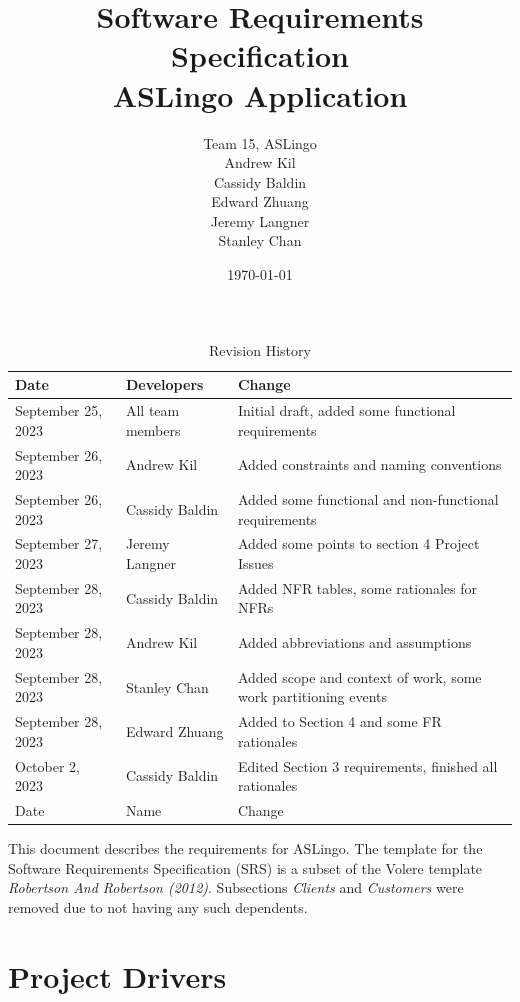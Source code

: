 \documentclass[12pt, titlepage]{article}
\title{Software Requirements Specification\\ASLingo Application}
\author{Team 15, ASLingo
		\\ Andrew Kil
		\\ Cassidy Baldin
		\\ Edward Zhuang
		\\ Jeremy Langner
		\\ Stanley Chan
}
\date{\today}
\begin{document}
\maketitle

\tableofcontents
\listoftables
\listoffigures

\begin{table}[H]
\caption{Revision History}
\begin{tabularx}{\textwidth}{|l|l|X|}
\hline {\bf Date} & {\bf Developers} & {\bf Change}\\
\hline
September 25, 2023 & All team members & Initial draft, added some functional requirements \\
September 26, 2023 & Andrew Kil & Added constraints and naming conventions \\
September 26, 2023 & Cassidy Baldin & Added some functional and non-functional requirements \\
September 27, 2023 & Jeremy Langner & Added some points to section 4 Project Issues \\
September 28, 2023 & Cassidy Baldin & Added NFR tables, some rationales for NFRs \\
September 28, 2023 & Andrew Kil & Added abbreviations and assumptions \\
September 28, 2023 & Stanley Chan & Added scope and context of work, some work partitioning events \\
September 28, 2023 & Edward Zhuang & Added to Section 4 and some FR rationales \\
October 2, 2023 & Cassidy Baldin & Edited Section 3 requirements, finished all rationales \\
Date & Name & Change\\
\bottomrule
\end{tabularx}
\end{table}

\newpage


This document describes the requirements for ASLingo. The template for the Software
Requirements Specification (SRS) is a subset of the Volere
template \textit{Robertson And Robertson (2012)}.  Subsections \textit{Clients} and \textit{Customers} were removed due to not having any such dependents.

\section{Project Drivers}
\end{document}
